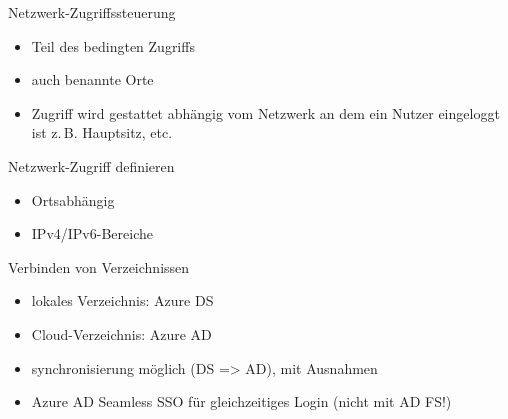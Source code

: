 
\begin{flashcard}[Definition]{Netzwerk-Zugriffssteuerung}
  \begin{itemize}
    \item Teil des bedingten Zugriffs
    \item auch benannte Orte
    \item Zugriff wird gestattet abhängig vom Netzwerk an dem ein Nutzer eingeloggt ist\newline
      z.\,B. Hauptsitz, etc.
  \end{itemize}
\end{flashcard}

\begin{flashcard}[Definition]{Netzwerk-Zugriff definieren}
  \begin{itemize}
    \item Ortsabhängig
    \item IPv4/IPv6-Bereiche
  \end{itemize}
\end{flashcard}


\begin{flashcard}[Definition]{Verbinden von Verzeichnissen}
  \begin{itemize}
    \item lokales Verzeichnis: Azure DS
    \item Cloud-Verzeichnis: Azure AD
    \item synchronisierung möglich (DS => AD), mit Ausnahmen
    \item Azure AD Seamless SSO für gleichzeitiges Login (nicht mit AD FS!)
  \end{itemize}
\end{flashcard}

